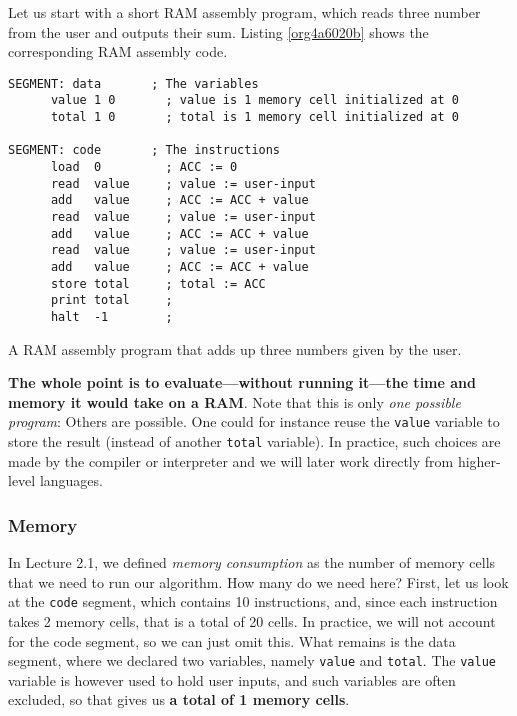 \documentclass[11pt]{article}
\begin{document}
Let us start with a short RAM assembly program, which reads three
number from the user and outputs their sum. Listing
\ref{org4a6020b} shows the corresponding RAM assembly code. 

\begin{listing}[htbp]
\begin{verbatim}
SEGMENT: data       ; The variables
      value 1 0       ; value is 1 memory cell initialized at 0
      total 1 0       ; total is 1 memory cell initialized at 0  

SEGMENT: code       ; The instructions
      load  0         ; ACC := 0
      read  value     ; value := user-input
      add   value     ; ACC := ACC + value
      read  value     ; value := user-input
      add   value     ; ACC := ACC + value
      read  value     ; value := user-input
      add   value     ; ACC := ACC + value
      store total     ; total := ACC
      print total     ; 
      halt  -1        ;
\end{verbatim}
\caption{\label{org4a6020b}A RAM assembly program that adds up three numbers given by the user.}
\end{listing}

\textbf{The whole point is to evaluate---without running it---the time and
memory it would take on a RAM}. Note that this is only \emph{one possible
program}: Others are possible. One could for instance reuse the
\texttt{value} variable to store the result (instead of another \texttt{total}
variable). In practice, such choices are made by the compiler or
interpreter and we will later work directly from higher-level
languages.

\subsubsection*{Memory}
\label{sec:orgc365fd8}

In Lecture 2.1, we defined \emph{memory consumption} as the number of
memory cells that we need to run our algorithm. How many do we need
here? First, let us look at the \texttt{code} segment, which contains 10
instructions, and, since each instruction takes 2 memory cells, that
is a total of 20 cells. In practice, we will not account for the code
segment, so we can just omit this. What remains is the data segment,
where we declared two variables, namely \texttt{value} and \texttt{total}. The
\texttt{value} variable is however used to hold user inputs, and such
variables are often excluded, so that gives us \textbf{a total of 1 memory
cells}.
\end{document}
